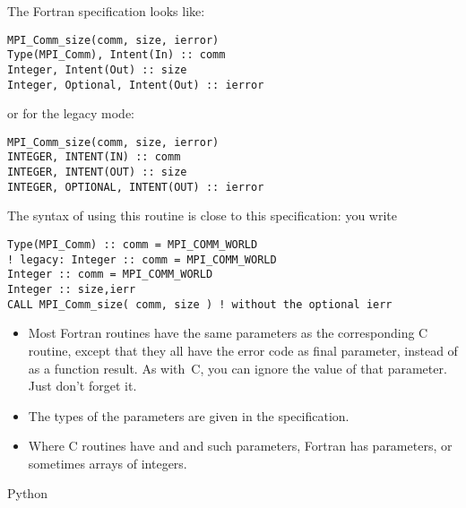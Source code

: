 The Fortran specification looks like:
\lstset{language=Fortran} %
\begin{lstlisting}
MPI_Comm_size(comm, size, ierror)
Type(MPI_Comm), Intent(In) :: comm
Integer, Intent(Out) :: size
Integer, Optional, Intent(Out) :: ierror
\end{lstlisting}
or for the  legacy mode:
\begin{lstlisting}
MPI_Comm_size(comm, size, ierror)
INTEGER, INTENT(IN) :: comm
INTEGER, INTENT(OUT) :: size
INTEGER, OPTIONAL, INTENT(OUT) :: ierror
\end{lstlisting}
The syntax of using this routine is close to this specification: you
write
\begin{lstlisting}
Type(MPI_Comm) :: comm = MPI_COMM_WORLD
! legacy: Integer :: comm = MPI_COMM_WORLD
Integer :: comm = MPI_COMM_WORLD
Integer :: size,ierr
CALL MPI_Comm_size( comm, size ) ! without the optional ierr
\end{lstlisting}
\lstset{language=C} %

\begin{itemize}
\item Most Fortran routines have the same parameters as the
  corresponding C routine, except that they all have the error code as
  final parameter, instead of as a function result. As with~C, you can
  ignore the value of that parameter. Just don't forget it.
\item The types of the parameters are given in the specification.
\item Where C routines have  and  and such
  parameters, Fortran has  parameters, or sometimes arrays
  of integers.
\end{itemize}

 {Python}

